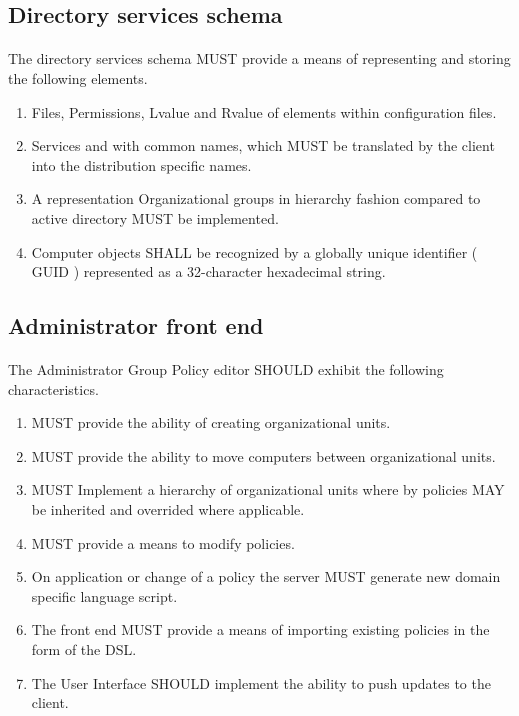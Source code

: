 			\subsection{Directory services schema}	
				\vspace{1cm}
				\paragraph{}
				The directory services schema MUST provide a means of representing and storing the following elements.

					\begin{enumerate}
						\item 	Files, Permissions, Lvalue and Rvalue of elements within configuration files.
						\item 	Services and with common names, which MUST be translated by the client into the distribution specific names.
						\item 	A representation Organizational groups in hierarchy fashion compared to active directory MUST be implemented.
						\item 	Computer objects SHALL be recognized by a globally unique identifier ( GUID ) represented as a 32-character hexadecimal string. 
					\end{enumerate}

			\subsection{Administrator front end}
				\vspace{1cm}
				\paragraph{}
				The Administrator Group Policy editor SHOULD exhibit the following characteristics. 

					\begin{enumerate}
						\item 	MUST provide the ability of creating organizational units.
						\item 	MUST provide the ability to move computers between organizational units.
						\item 	MUST Implement a hierarchy of organizational units where by policies MAY be inherited and overrided where applicable. %
						\item 	MUST provide a means to modify policies.
						\item 	On application or change of a policy the server MUST generate new domain specific language script.
						\item 	The front end MUST provide a means of importing existing policies in the form of the DSL.
						\item 	The User Interface SHOULD implement the ability to push updates to the client.
					\end{enumerate}

